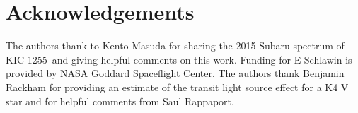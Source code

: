 \documentclass[preprint,trackchanges]{aastex61}
\newcommand{\shStar}{KIC 1255}
\begin{document}
\section{Acknowledgements}
The authors thank to Kento Masuda for sharing the 2015 Subaru spectrum of \shStar\ and giving helpful comments on this work.
Funding for E Schlawin is provided by NASA Goddard Spaceflight Center.
The authors thank Benjamin Rackham for providing an estimate of the transit light source effect for a K4 V star and for helpful comments from Saul Rappaport.







\end{document}
